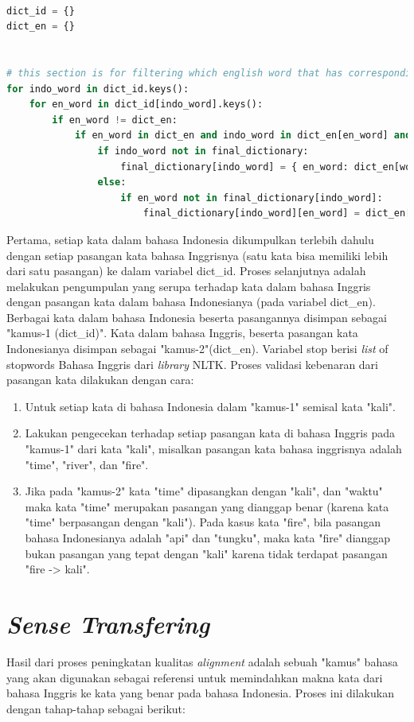 \begin{lstlisting}[language=Python, caption={Word Alignment Enhancement}, label={word-alignment-enhancement}]

dict_id = {}
dict_en = {}


# this section is for filtering which english word that has corresponding indo translation (bidirectional) from Giza output
for indo_word in dict_id.keys():
	for en_word in dict_id[indo_word].keys():
		if en_word != dict_en:
			if en_word in dict_en and indo_word in dict_en[en_word] and en_word not in stop:
				if indo_word not in final_dictionary:
					final_dictionary[indo_word] = { en_word: dict_en[word_en][word_id] }
				else:
					if en_word not in final_dictionary[indo_word]:
						final_dictionary[indo_word][en_word] = dict_en[word_en][word_id]
\end{lstlisting}

Pertama, setiap kata dalam bahasa Indonesia dikumpulkan terlebih dahulu dengan setiap pasangan kata bahasa Inggrisnya (satu kata bisa memiliki lebih dari satu pasangan) ke dalam variabel dict\_id. Proses selanjutnya adalah melakukan pengumpulan yang serupa terhadap kata dalam bahasa Inggris dengan pasangan kata dalam bahasa Indonesianya (pada variabel dict\_en). Berbagai kata dalam bahasa Indonesia beserta pasangannya disimpan sebagai "kamus-1 (dict\_id)". Kata dalam bahasa Inggris, beserta pasangan kata Indonesianya disimpan sebagai "kamus-2"(dict\_en). Variabel stop berisi \textit{list} of stopwords Bahasa Inggris dari \textit{library} NLTK. Proses validasi kebenaran dari pasangan kata dilakukan dengan cara:

\begin{enumerate}
	\item Untuk setiap kata di bahasa Indonesia dalam "kamus-1" semisal kata "kali".
	\item Lakukan pengecekan terhadap setiap pasangan kata di bahasa Inggris pada "kamus-1" dari kata "kali", misalkan pasangan kata bahasa inggrisnya adalah "time", "river", dan "fire".
	\item Jika pada "kamus-2" kata "time" dipasangkan dengan "kali", dan "waktu" maka kata "time" merupakan pasangan yang dianggap benar (karena kata "time" berpasangan dengan "kali"). Pada kasus kata "fire", bila pasangan bahasa Indonesianya adalah "api" dan "tungku", maka kata "fire" dianggap bukan pasangan yang tepat dengan "kali" karena tidak terdapat pasangan "fire -> kali".
\end{enumerate} 


\section{\textit{Sense Transfering}}
Hasil dari proses peningkatan kualitas \textit{alignment} adalah sebuah "kamus" bahasa yang akan digunakan sebagai referensi untuk memindahkan makna kata dari bahasa Inggris ke kata yang benar pada bahasa Indonesia. Proses ini dilakukan dengan tahap-tahap sebagai berikut:

